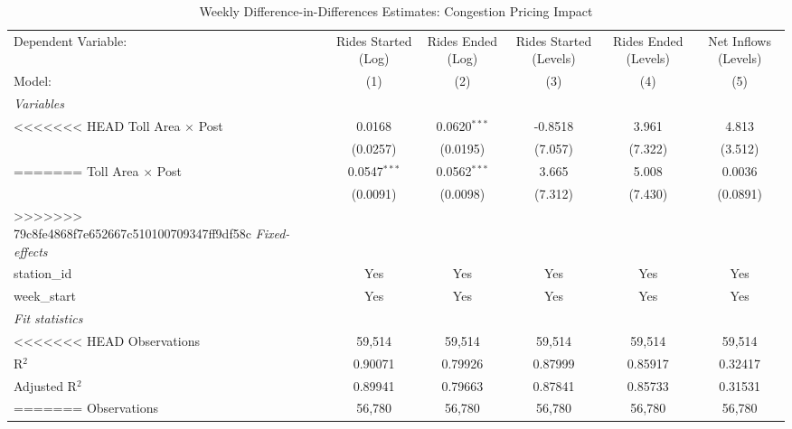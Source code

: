 
\begin{table}[htbp]
   \caption{\label{tab:did_static_daily} Weekly Difference-in-Differences Estimates: Congestion Pricing Impact}
   \centering
   \begin{tabular}{lccccc}
      \tabularnewline \midrule \midrule
      Dependent Variable:      & Rides Started (Log) & Rides Ended (Log) & Rides Started (Levels) & Rides Ended (Levels) & Net Inflows (Levels) \\   
      Model:                   & (1)                 & (2)               & (3)                    & (4)                  & (5)\\  
      \midrule
      \emph{Variables}\\
<<<<<<< HEAD
      Toll Area $\times$ Post  & 0.0168              & 0.0620$^{***}$    & -0.8518                & 3.961                & 4.813\\   
                               & (0.0257)            & (0.0195)          & (7.057)                & (7.322)              & (3.512)\\   
=======
      Toll Area $\times$ Post  & 0.0547$^{***}$      & 0.0562$^{***}$    & 3.665                  & 5.008                & 0.0036\\   
                               & (0.0091)            & (0.0098)          & (7.312)                & (7.430)              & (0.0891)\\   
>>>>>>> 79c8fe4868f7e652667c510100709347ff9df58c
      \midrule
      \emph{Fixed-effects}\\
      station\_id              & Yes                 & Yes               & Yes                    & Yes                  & Yes\\  
      week\_start              & Yes                 & Yes               & Yes                    & Yes                  & Yes\\  
      \midrule
      \emph{Fit statistics}\\
<<<<<<< HEAD
      Observations             & 59,514              & 59,514            & 59,514                 & 59,514               & 59,514\\  
      R$^2$                    & 0.90071             & 0.79926           & 0.87999                & 0.85917              & 0.32417\\  
      Adjusted R$^2$           & 0.89941             & 0.79663           & 0.87841                & 0.85733              & 0.31531\\  
=======
      Observations             & 56,780              & 56,780            & 56,780                 & 56,780               & 56,780\\  

\end{tabular}
\end{table}

